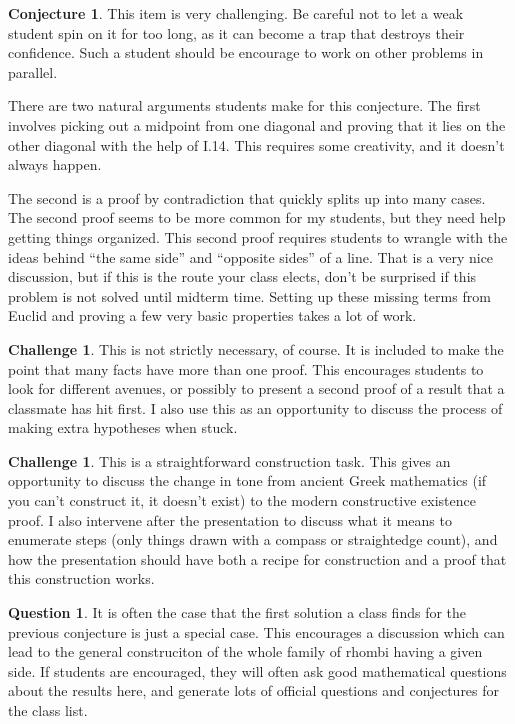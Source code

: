 \documentclass{tufte-handout}
\theoremstyle{definition}
\newtheorem{conjecture}[problem]{Conjecture}
\newtheorem{question}[problem]{Question}
\newtheorem{challenge}[problem]{Challenge}
\begin{document}
\begin{conjecture}
This item is very challenging.
Be careful not to let a weak student spin on it for too long, as it can become a trap that destroys their confidence.
Such a student should be encourage to work on other problems in parallel.

There are two natural arguments students make for this conjecture.
The first involves picking out a midpoint from one diagonal and proving that it lies on the other diagonal with the help of I.14.
This requires some creativity, and it doesn't always happen.

The second is a proof by contradiction that quickly splits up into many cases.
The second proof seems to be more common for my students, but they need help getting things organized.
This second proof requires students to wrangle with the ideas behind ``the same side'' and ``opposite sides'' of a line.
That is a very nice discussion, but if this is the route your class elects, don't be surprised if this problem is not solved until midterm time.
Setting up these missing terms from Euclid and proving a few very basic properties takes a lot of work.
\end{conjecture}

\begin{challenge}
This is not strictly necessary, of course.
It is included to make the point that many facts have more than one proof.
This encourages students to look for different avenues, or possibly to present a second proof of a result that a classmate has hit first.
I also use this as an opportunity to discuss the process of making extra hypotheses when stuck.
\end{challenge}

\begin{challenge}
This is a straightforward construction task.
This gives an opportunity to discuss the change in tone from ancient Greek mathematics (if you can't construct it, it doesn't exist) to the modern constructive existence proof.
I also intervene after the presentation to discuss what it means to enumerate steps (only things drawn with a compass or straightedge count), and how the presentation should have both a recipe for construction and a proof that this construction works.
\end{challenge}

\begin{question}
It is often the case that the first solution a class finds for the previous conjecture is just a special case.
This encourages a discussion which can lead to the general construciton of the whole family of rhombi having a given side.
If students are encouraged, they will often ask good mathematical questions about the results here, and generate lots of official questions and conjectures for the class list.
\end{question}
\end{document}
